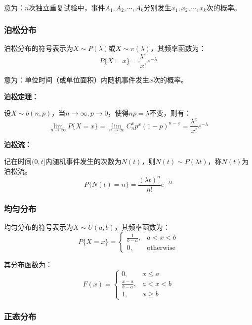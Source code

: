 \documentclass[a4paper,12pt]{ctexart}
\begin{document}
意为：$n$次独立重复试验中，事件$A_1,A_2,\cdots,A_k$分别发生$x_1,x_2,\cdots,x_k$次的概率。

\subsubsection{泊松分布}

泊松分布的符号表示为$X\sim P(\lambda)$或$X\sim \pi(\lambda)$，其频率函数为：
\begin{equation*}
	P\{X = x\} = \frac{\lambda^x}{x!}e^{-\lambda}
\end{equation*}

意为：单位时间（或单位面积）内随机事件发生$x$次的概率。

\textbf{泊松定理：}

设$X\sim b(n,p)$，当$n\rightarrow\infty,p\rightarrow0$，使得$np=\lambda$不变，则有：
\begin{equation*}
	\lim_{n\rightarrow\infty}P\{X = x\} = \lim_{n\rightarrow\infty}C_n^xp^x(1-p)^{n-x} = \frac{\lambda^x}{x!}e^{-\lambda}
\end{equation*}

\textbf{泊松流：}

记在时间$(0,t]$内随机事件发生的次数为$N(t)$，则$N(t)\sim P(\lambda t)$，称$N(t)$为泊松流。
\begin{equation*}
	P\{N(t) = n\} = \frac{(\lambda t)^n}{n!}e^{-\lambda t}
\end{equation*}

\subsubsection{均匀分布}

均匀分布的符号表示为$X\sim U(a,b)$，其频率函数为：
\begin{equation*}
	P\{X = x\} = \begin{cases}
		\frac{1}{b-a}, & a<x<b \\
		0, & \text{otherwise}
	\end{cases}
\end{equation*}

其分布函数为：
\begin{equation*}
	F(x) = \begin{cases}
		0, & x\leq a \\
		\frac{x-a}{b-a}, & a<x<b \\
		1, & x\geq b
	\end{cases}
\end{equation*}

\subsubsection{正态分布}
\end{document}
